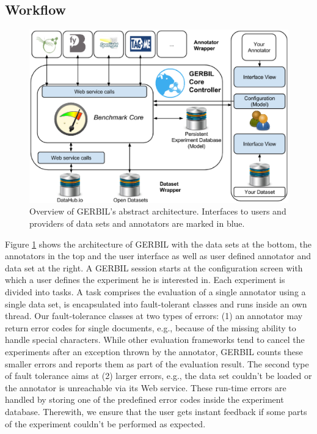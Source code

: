 \subsection{Workflow}
\begin{figure}[tb]
    \centering
    \includegraphics[width=0.9\linewidth]{part_02/benchmarking/ESWC_2015_DEV_GERBIL/gerbiloverview.eps}
    \caption{Overview of GERBIL's abstract architecture. Interfaces to users and providers of data sets and annotators are marked in blue.}
    \label{cha334:fig:architecture}
\end{figure}
Figure \ref{cha334:fig:architecture} shows the architecture of GERBIL with the data sets at the bottom, the annotators in the top and the user interface as well as user defined annotator and data set at the right.
A GERBIL session starts at the configuration screen with which a user defines the experiment he is interested in.
Each experiment is divided into tasks.
A task comprises the evaluation of a single annotator using a single data set, is encapsulated into fault-tolerant classes and runs inside an own thread.
Our fault-tolerance classes at two types of errors: (1) an annotator may return error codes for single documents, e.g., because of the missing ability to handle special characters.
While other evaluation frameworks tend to cancel the experiments after an exception thrown by the annotator, GERBIL counts these smaller errors and reports them as part of the evaluation result.
The second type of fault tolerance aims at (2) larger errors, e.g., the data set couldn't be loaded or the annotator is unreachable via its Web service.
These run-time errors are handled by storing one of the predefined error codes inside the experiment database.
Therewith, we ensure that the user gets instant feedback if some parts of the experiment couldn't be performed as expected.

